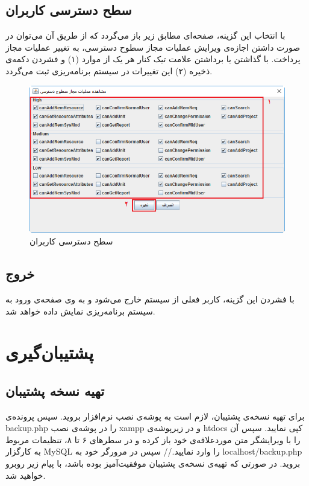 \subsection{سطح دسترسی کاربران}
با انتخاب این گزینه، صفحه‌ای مطابق زیر باز می‌گردد که از طریق آن می‌توان در صورت داشتن اجازه‌ی ویرایش عملیات مجاز سطوح دسترسی، به تغییر عملیات مجاز پرداخت. با گذاشتن یا برداشتن علامت تیک کنار هر یک از موارد (۱) و فشردن دکمه‌ی ذخیره (۲) این تغییرات در سیستم برنامه‌ریزی ثبت می‌گردد.

	\begin{figure}[H]
		\centering
		\includegraphics[scale=0.7]{img/manual/ac}
		\caption{سطح دسترسی کاربران}
	\end{figure}

	
\subsection{خروج}
با فشردن این گزینه، کاربر فعلی از سیستم خارج می‌شود و به وی صفحه‌ی ورود به سیستم برنامه‌ریزی نمایش داده خواهد شد.

\section{پشتیبان‌گیری}
\subsection{تهیه نسخه پشتیبان}
برای تهیه نسخه‌ی پشتیبان، لازم است به پوشه‌ی نصب نرم‌افزار بروید. سپس پرونده‌ی  backup.php را در پوشه‌ی نصب xampp و در زیرپوشه‌ی  htdocs کپی نمایید. سپس آن را با ویرایشگر متن موردعلاقه‌ی خود باز کرده و در سطرهای ۶ تا ۸، تنظیمات مربوط به کارگزار MySQL را وارد نمایید.//
سپس در مرورگر خود به  localhost/backup.php بروید. در صورتی که تهیه‌ی نسخه‌ی پشتیبان موفقیت‌آمیز بوده باشد، با پیام زیر روبرو خواهید شد.

